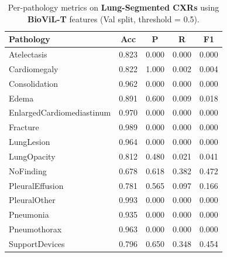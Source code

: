 \begin{table}[H]
\centering
\small
\begin{tabular}{lcccc}
\toprule
\textbf{Pathology} & \textbf{Acc} & \textbf{P} & \textbf{R} & \textbf{F1} \\
\midrule
Atelectasis               & 0.823 & 0.000 & 0.000 & 0.000 \\
Cardiomegaly              & 0.822 & 1.000 & 0.002 & 0.004 \\
Consolidation             & 0.962 & 0.000 & 0.000 & 0.000 \\
Edema                     & 0.891 & 0.600 & 0.009 & 0.018 \\
EnlargedCardiomediastinum & 0.970 & 0.000 & 0.000 & 0.000 \\
Fracture                  & 0.989 & 0.000 & 0.000 & 0.000 \\
LungLesion                & 0.964 & 0.000 & 0.000 & 0.000 \\
LungOpacity               & 0.812 & 0.480 & 0.021 & 0.041 \\
NoFinding                 & 0.678 & 0.618 & 0.382 & 0.472 \\
PleuralEffusion           & 0.781 & 0.565 & 0.097 & 0.166 \\
PleuralOther              & 0.993 & 0.000 & 0.000 & 0.000 \\
Pneumonia                 & 0.935 & 0.000 & 0.000 & 0.000 \\
Pneumothorax              & 0.963 & 0.000 & 0.000 & 0.000 \\
SupportDevices            & 0.796 & 0.650 & 0.348 & 0.454 \\
\bottomrule
\end{tabular}
\caption{Per-pathology metrics on \textbf{Lung-Segmented CXRs} using \textbf{BioViL-T} features (Val split, threshold = 0.5).}
\label{tab:seg_biovil}
\end{table}

